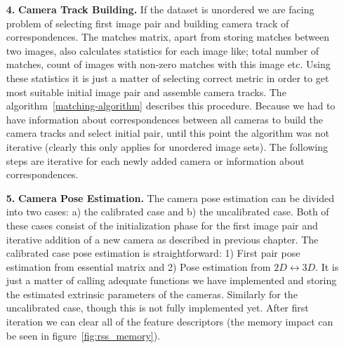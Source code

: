 \begin{itemize}
\begin{algorithm}[ht]
\begin{algorithmic}[1]
	\Statex
	\State Select initial pair of images $(i_1, i_2), 1 \leq i_1 \leq N, 1 \leq i_2 \leq N, i_1 \neq i_2$
	\State Add pair $(i_1, i_2)$ to \textbf{result}
	\State Add camera $i_1$, $i_2$ to list \textbf{todo}
				\State Add pair $(i, j)$ to \textbf{tmp\textunderscore result}
				\State Add camera $j$ to list \textbf{todo}
			\EndIf			
		\EndFor
		\State Sort \textbf{tmp\textunderscore result} descending by the number of matches.
		\State Add all new pairs from \textbf{tmp\textunderscore result} to \textbf{result}
		\State Clear \textbf{tmp\textunderscore result}
	\EndFor
\end{algorithmic}
\caption{Creating camera track}
\label{matching-algorithm}
\end{algorithm}

\item[\textbf{4.}] \textbf{Camera Track Building.}
If the dataset is unordered we are facing problem of selecting first image pair and building camera track of correspondences. The matches matrix, apart from storing matches between two images, also calculates statistics for each image like; total number of matches, count of images with non-zero matches with this image etc. Using these statistics it is just a matter of selecting correct metric in order to get most suitable initial image pair and assemble camera tracks. The algorithm~\ref{matching-algorithm} describes this procedure. Because we had to have information about correspondences between all cameras to build the camera tracks and select initial pair, until this point the algorithm was not iterative (clearly this only applies for unordered image sets). The following steps are iterative for each newly added camera or information about correspondences. 

\item[\textbf{5.}] \textbf{Camera Pose Estimation.}
The camera pose estimation can be divided into two cases: a) the calibrated case and b) the uncalibrated case. Both of these cases consist of the initialization phase for the first image pair and iterative addition of a new camera as described in previous chapter. The calibrated case pose estimation is straightforward: 1) First pair pose estimation from essential matrix and 2) Pose estimation from $2D \leftrightarrow 3D$. It is just a matter of calling adequate functions we have implemented and storing the estimated extrinsic parameters of the cameras. Similarly for the uncalibrated case, though this is not fully implemented yet. After first iteration we can clear all of the feature descriptors (the memory impact can be seen in figure~\ref{fig:rss_memory}).


\end{itemize}
